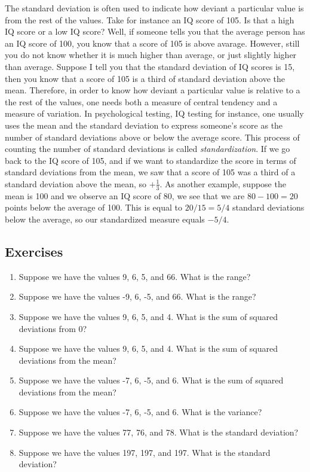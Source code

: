 \documentclass[]{book}\usepackage[]{graphicx}\usepackage[]{color}
\begin{document}
The standard deviation is often used to indicate how deviant a particular value is from the rest of the values. Take for instance an IQ score of 105. Is that a high IQ score or a low IQ score? Well, if someone tells you that the average person has an IQ score of 100, you know that a score of 105 is above avarage. However, still you do not know whether it is much higher than average, or just slightly higher than average. Suppose I tell you that the standard deviation of IQ scores is 15, then you know that a score of 105 is a third of standard deviation above the mean. Therefore, in order to know how deviant a particular value is relative to a the rest of the values, one needs both a measure of central tendency and a measure of variation. In psychological testing, IQ testing for instance, one usually uses the mean and the standard deviation to express someone's score as the number of standard deviations above or below the average score. This process of counting the number of standard deviations is called \textit{standardization}. If we go back to the IQ score of 105, and if we want to standardize the score in terms of standard deviations from the mean, we saw that a score of 105 was a third of a standard deviation above the mean, so $+\frac{1}{3}$. As another example, suppose the mean is 100 and we observe an IQ score of 80, we see that we are $80-100=20$ points below the average of 100. This is equal to $20/15=5/4$ standard deviations below the average, so our standardized measure equals $-5/4$.



\subsection{Exercises}

\begin{enumerate}
\item Suppose we have the values 9, 6, 5, and 66. What is the range?
\item Suppose we have the values -9, 6, -5, and 66. What is the range?
\item Suppose we have the values 9, 6, 5, and 4. What is the sum of squared deviations from 0?
\item Suppose we have the values 9, 6, 5, and 4. What is the sum of squared deviations from the mean?
\item Suppose we have the values -7, 6, -5, and 6. What is the sum of squared deviations from the mean?
\item Suppose we have the values -7, 6, -5, and 6. What is the variance?
\item Suppose we have the values 77, 76, and 78. What is the standard deviation?
\item Suppose we have the values 197, 197, and 197. What is the standard deviation?
\end{enumerate}
\end{document}
